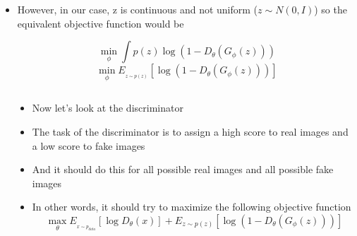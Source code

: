 {\begin{frame}
\begin{columns}
\begin{overlayarea}{\textwidth}{\textheight}
\begin{itemize}[<+->]
				$$ \min\limits_{\phi}  \sum_{i=1}^{N} \frac{1}{N} \log (1 - D_{\theta}(G_{\phi}(z))) $$

				\item However, in our case, z is continuous and not uniform ($z \sim N(0, I)$) so the equivalent objective function would be 

				$$\min \limits_{\phi} \int p(z) \log(1 - D_{\theta}(G_{\phi}(z)))$$
				$$\min \limits_{\phi}  E_{_{z \sim p(z)}} [\log (1 - D_{\theta}(G_{\phi}(z)))] $$

			\end{itemize}
		\end{overlayarea}
	\end{columns}
\end{frame}

\begin{frame}
	\begin{columns}
		\begin{overlayarea}{\textwidth}{\textheight}
			\vspace*{10mm}
			\begin{center}
						
			\end{center}		
		\end{overlayarea}

		\begin{overlayarea}{\textwidth}{\textheight}
			\begin{itemize}[<+->]\justifying
				\item Now let's look at the discriminator
				\item The task of the discriminator is to assign a high score to real images and a low score to fake images
				\item And it should do this for all possible real images and all possible fake images
				\item In other words, it should try to maximize the following objective function
				$$ \max_{\theta} E_{_{x \sim p_{data}}} [\log D_{\theta}(x)] + E_{z \sim p(z)} [\log (1 - D_{\theta}(G_{\phi}(z)))]$$
			\end{itemize}
		\end{overlayarea}
	\end{columns}
\end{frame}

\begin{frame}
	\begin{columns}
		\column{0.45\textwidth}
		\begin{overlayarea}{\textwidth}{\textheight}
			\vspace*{10mm}
			\begin{center}
						
			\end{center}		
		\end{overlayarea}


\end{columns}
\end{frame}}

